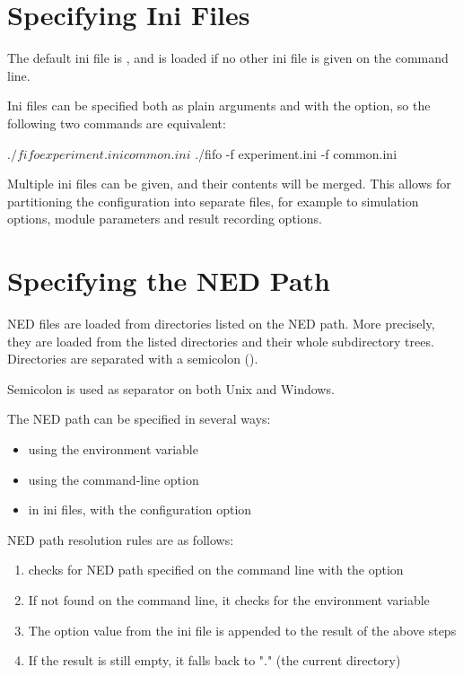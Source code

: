 \section{Specifying Ini Files}
\label{sec:run-sim:specifying-ini-files}

The default ini file is , and is
loaded if no other ini file is given on the command line.

Ini files can be specified both as plain arguments and with the 
option, so the following two commands are equivalent:

\begin{commandline}
$ ./fifo experiment.ini common.ini
$ ./fifo -f experiment.ini -f common.ini
\end{commandline}

Multiple ini files can be given, and their contents will be merged. This
allows for partitioning the configuration into separate files, for example
to simulation options, module parameters and result recording options.


\section{Specifying the NED Path}
\label{sec:run-sim:specifying-ned-path}

NED files are loaded from directories listed on the NED path. More precisely,
they are loaded from the listed directories and their whole subdirectory trees.
Directories are separated with a semicolon (\ttt{;}).

\begin{note}
Semicolon is used as separator on both Unix and Windows.
\end{note}

The NED path can be specified in several ways:
\begin{itemize}
  \item using the  environment variable
  \item using the  command-line option
  \item in ini files, with the  configuration option
\end{itemize}

NED path resolution rules are as follows:

\begin{enumerate}
  \item {\opp} checks for NED path specified on the command line with the  option
  \item If not found on the command line, it checks for the  environment variable
  \item The  option value from the ini file is appended to the result of the above steps
  \item If the result is still empty, it falls back to "." (the current directory)
\end{enumerate}


